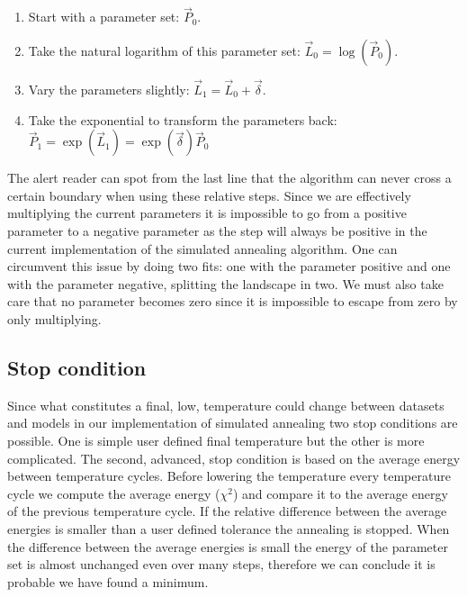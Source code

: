 \begin{enumerate}
\item Start with a parameter set: $\vec{P}_0$.
\item Take the natural logarithm of this parameter set: $\vec{L}_0 = \log(\vec{P}_0)$.
\item Vary the parameters slightly: $\vec{L}_1 = \vec{L}_0 + \vec{\delta}$.
\item Take the exponential to transform the parameters back: $\vec{P}_1 = \exp(\vec{L}_1) = \exp(\vec{\delta})\vec{P}_0$
\end{enumerate}

The alert reader can spot from the last line that the algorithm can never cross a certain boundary when using these relative steps. Since we are effectively multiplying the current parameters it is impossible to go from a positive parameter to a negative parameter as the step will always be positive in the current implementation of the simulated annealing algorithm. One can circumvent this issue by doing two fits: one with the parameter positive and one with the parameter negative, splitting the landscape in two. We must also take care that no parameter becomes zero since it is impossible to escape from zero by only multiplying.


\subsection{Stop condition}

Since what constitutes a final, low, temperature could change between datasets and models in our implementation of simulated annealing two stop conditions are possible. One is simple user defined final temperature but the other is more complicated. The second, advanced, stop condition is based on the average energy between temperature cycles. Before lowering the temperature every temperature cycle we compute the average energy ($\chi^2$) and compare it to the average energy of the previous temperature cycle. If the relative difference between the average energies is smaller than a user defined tolerance the annealing is stopped. When the difference between the average energies is small the energy of the parameter set is almost unchanged even over many steps, therefore we can conclude it is probable we have found a minimum.





